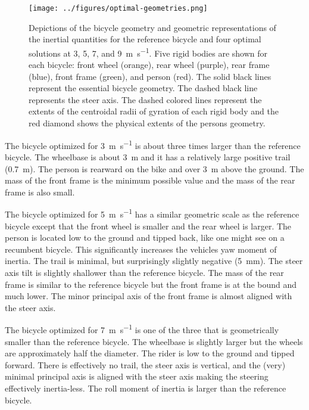 \documentclass{bmd2019p}
\begin{document}
%
\begin{figure}
  \centering
  \texttt{[image: ../figures/optimal-geometries.png]}
  \label{fig:optimal-geometries}
  \caption{Depictions of the bicycle geometry and geometric representations of
    the inertial quantities for the reference bicycle and four optimal
    solutions at 3, 5, 7, and 9~\si{\meter\per\second}. Five rigid bodies are
    shown for each bicycle: front wheel (orange), rear wheel (purple), rear
    frame (blue), front frame (green), and person (red). The solid black lines
    represent the essential bicycle geometry. The dashed black line represents
    the steer axis. The dashed colored lines represent the extents of the
    centroidal radii of gyration of each rigid body and the red diamond shows
    the physical extents of the persons geometry.}
\end{figure}

The bicycle optimized for 3~\si{\meter\per\second} is about three times larger
than the reference bicycle. The wheelbase is about 3~\si{\meter} and it has a
relatively large positive trail (0.7~\si{\meter}). The person is rearward on
the bike and over 3~\si{\meter} above the ground. The mass of the front frame
is the minimum possible value and the mass of the rear frame is also small.

The bicycle optimized for 5~\si{\meter\per\second} has a similar geometric
scale as the reference bicycle except that the front wheel is smaller and the
rear wheel is larger. The person is located low to the ground and tipped back,
like one might see on a recumbent bicycle. This significantly increases the
vehicles yaw moment of inertia. The trail is minimal, but surprisingly slightly
negative (5~\si{\milli\meter}). The steer axis tilt is slightly shallower than
the reference bicycle. The mass of the rear frame is similar to the reference
bicycle but the front frame is at the bound and much lower. The minor principal
axis of the front frame is almost aligned with the steer axis.

The bicycle optimized for 7~\si{\meter\per\second} is one of the three that is
geometrically smaller than the reference bicycle. The wheelbase is slightly
larger but the wheels are approximately half the diameter. The rider is low to
the ground and tipped forward. There is effectively no trail, the steer axis is
vertical, and the (very) minimal principal axis is aligned with the steer axis
making the steering effectively inertia-less. The roll moment of inertia is
larger than the reference bicycle.
\end{document}
